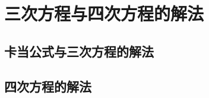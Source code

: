 
\section{三次方程与四次方程的解法}
\label{sec:solve-high-equation}

\subsection{卡当公式与三次方程的解法}
\label{sec:solve-equation-with-3-degree}

\subsection{四次方程的解法}
\label{sec:solve-equation-with-4-degree}


